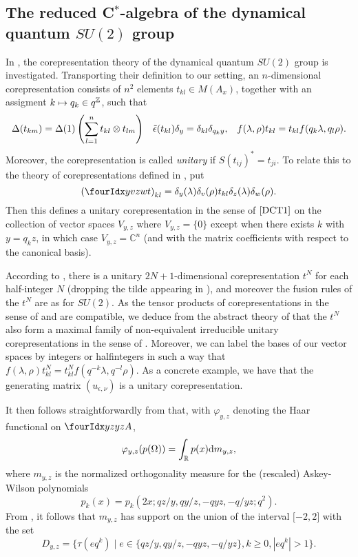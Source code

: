 \subsection{The reduced C$^*$-algebra of the dynamical quantum $SU(2)$ group}

In \cite{KoR1}, the corepresentation theory of the dynamical quantum $SU(2)$ group is investigated. Transporting their definition to our setting, an $n$-dimensional corepresentation consists of $n^2$ elements $t_{kl} \in M(A_x)$, together with an assigment $k \mapsto q_k \in q^{\mathbb{Z}}$, such that \begin{align*} \Delta(t_{km}) = \Delta(1)\left(\sum_{l=1}^n t_{kl}\otimes t_{lm}\right)&& \operatorname{\tilde{\epsilon}}(t_{kl})\delta_y = \delta_{kl} \delta_{q_ky},&& f(\lambda,\rho)t_{kl} = t_{kl}f(q_k\lambda,q_l\rho).\end{align*} Moreover, the corepresentation is called \emph{unitary} if $S(t_{ij})^* =t_{ji}$. To relate this to the theory of corepresentations defined in \cite{DCT1}, put \[\left(\Gr{t}{y}{z}{v}{w}\right)_{kl} = \delta_{y}(\lambda)\delta_v(\rho) t_{kl} \delta_{z}(\lambda)\delta_{w}(\rho).\] Then this defines a unitary corepresentation in the sense of $\cite{DCT1}$ on the collection of vector spaces $V_{y,z}$ where $V_{y,z}=\{0\}$ except when there exists $k$ with $y = q_kz$,  in which case $V_{y,z} = \mathbb{C}^n$ (and with the matrix coefficients with respect to the canonical basis). 

According to \cite{KoR1}, there is a unitary $2N+1$-dimensional corepresentation $t^N$ for each half-integer $N$ (dropping the tilde appearing in \cite{KoR1}), and moreover the fusion rules of the $t^N$ are as for $SU(2)$. As the tensor products of corepresentations in the sense of \cite{KoR1} and \cite{DCT1} are compatible, we deduce from the abstract theory of \cite{DCT1} that the $t^N$ also form a maximal family of non-equivalent irreducible unitary corepresentations in the sense of \cite{DCT1}. Moreover, we can label the bases of our vector spaces by integers or halfintegers in such a way that $f(\lambda,\rho)t_{kl}^N = t_{kl}^Nf(q^{-k}\lambda,q^{-l}\rho)$. As a concrete example, we have that the generating matrix $(u_{\epsilon,\nu})$ is a unitary corepresentation.


It then follows straightforwardly from \cite[Section 7]{KoR1} that, with $\varphi_{y,z}$ denoting the Haar functional on $\Gr{A}{y}{y}{z}{z}$, \[\varphi_{y,z}(p(\Omega)) = \int_{\mathbb{R}} p(x)\mathrm{d} m_{y,z},\] where $m_{y,z}$ is the normalized orthogonality measure for the (rescaled) Askey-Wilson polynomials \[p_k(x) = p_k(2x;qz/y,qy/z,-qyz,-q/yz;q^2).\] From \cite[Theorem 2.1,2.5]{AsW1}%
, it follows that $m_{y,z}$ has support on the union of the interval $\lbrack -2,2\rbrack$ with the set \[D_{y,z} = \{\tau(eq^k)\mid e\in \{qz/y,qy/z,-qyz,-q/yz\}, k\geq 0, |eq^k|>1\}.\]

